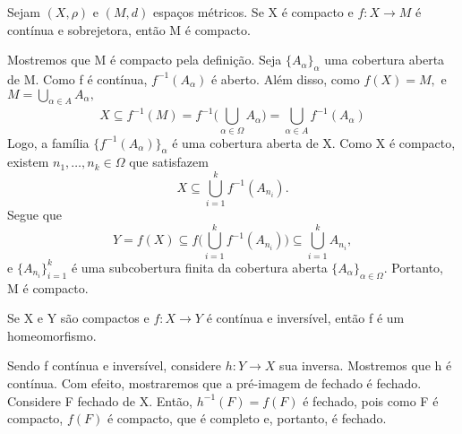 \documentclass[MetricSpaces/metric_notes.tex]{subfiles}
\begin{document}
\begin{theorem*}
	Sejam \((X, \rho )\) e \((M, d)\) espaços métricos. Se X é compacto e \(f:X\rightarrow M\) é contínua e sobrejetora, então M é compacto.
\end{theorem*}
\begin{proof*}
	Mostremos que M é compacto pela definição. Seja \(\{A_{\alpha }\}_{\alpha }\) uma cobertura aberta de M. Como f é contínua,
	\(f^{-1}(A_{\alpha })\) é aberto. Além disso, como \(f(X) = M,\) e \(M = \bigcup_{\alpha \in A}^{}A_{\alpha },\)
	\[
		X \subseteq f^{-1}(M) = f^{-1}\biggl(\bigcup_{\alpha \in \Omega }^{}A_{\alpha }\biggr) = \bigcup_{\alpha \in A}^{}f^{-1}(A_{\alpha })
	\]
	Logo, a família \(\{f^{-1}(A_{\alpha })\}_{\alpha }\) é uma cobertura aberta de X. Como X é compacto, existem \(n_{1}, \dotsc, n_{k}\in \Omega \)
	que satisfazem
	\[
		X\subseteq \bigcup_{i=1}^{k}f^{-1}(A_{n_{i}}).
	\]
	Segue que
	\[
		Y = f(X)\subseteq f \biggl(\bigcup_{i=1}^{k}f^{-1}(A_{n_{i}})\biggr)\subseteq \bigcup_{i=1}^{k}A_{n_{i}},
	\]
	e \(\{A_{n_{i}}\}_{i=1}^{k}\) é uma subcobertura finita da cobertura aberta \(\{A_{\alpha }\}_{\alpha \in \Omega }\). Portanto,
	M é compacto. \qedsymbol
\end{proof*}
\begin{crl*}
	Se X e Y são compactos e \(f:X\rightarrow Y\) é contínua e inversível, então f é um homeomorfismo.
\end{crl*}
\begin{proof*}
	Sendo f contínua e inversível, considere \(h:Y\rightarrow X\) sua inversa. Mostremos que h é contínua.
	Com efeito, mostraremos que a pré-imagem de fechado é fechado. Considere F fechado de X. Então,
	\(h^{-1}(F) = f(F)\) é fechado, pois como F é compacto, \(f(F)\) é compacto, que é completo e, portanto, é fechado. \qedsymbol
\end{proof*}
\end{document}
